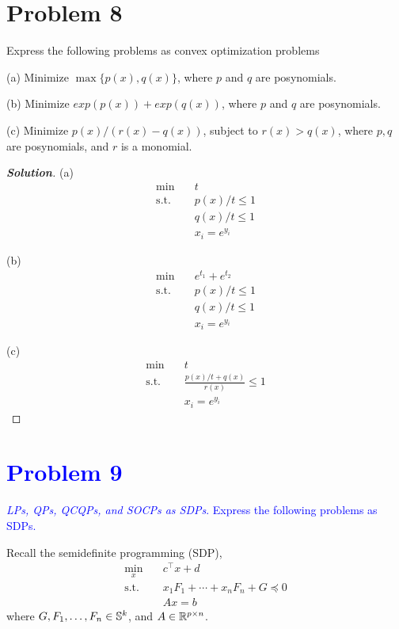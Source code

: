 \documentclass[11pt]{article}
\newenvironment{solution}
  {\renewcommand\qedsymbol{$\square$}\begin{proof}[\textbf{Solution}]}
  {\end{proof}}
\newcommand{\blue}[1]{\textcolor{blue}{#1}}
\newcommand{\T}{^\top}
\begin{document}
\clearpage
\section*{Problem 8}
Express the following problems as convex optimization problems

(a) Minimize $\max\{p(x), q(x)\}$, where $p$ and $q$ are posynomials.

(b) Minimize $exp(p(x)) + exp(q(x))$, where $p$ and $q$ are posynomials.

(c) Minimize $p(x) / (r(x) - q(x))$, subject to $r(x) > q(x)$, where $p, q$ are posynomials, and $r$ is a monomial.

\begin{solution}
  (a)
  \begin{align*}
    \min \quad & t\\
    \text{s.t.} \quad 
    & p(x) / t \leq 1\\
    & q(x) / t \leq 1\\
    & x_i = e^{y_i}
  \end{align*}

  (b)
  \begin{align*}
    \min \quad & e^{t_1} + e^{t_2}\\
    \text{s.t.} \quad 
    & p(x) / t \leq 1\\
    & q(x) / t \leq 1\\
    & x_i = e^{y_i}
  \end{align*}

  (c)
  \begin{align*}
    \min \quad & t\\
    \text{s.t.} \quad 
    & \frac{p(x)/t + q(x)}{r(x)} \leq 1\\
    & x_i = e^{y_i}
  \end{align*}
\end{solution}


\clearpage
\section*{\blue{Problem 9}}
\blue{\textit{LPs, QPs, QCQPs, and SOCPs as SDPs}. Express the following problems as SDPs.}

Recall the semidefinite programming (SDP),
\begin{align*}
  \min_x \quad & c\T x + d\\
  \text{s.t.}\quad 
  & x_1 F_1 + \cdots + x_n F_n + G \preceq 0\\
  & Ax = b
\end{align*}
where $G, F_1, \dots, F_n \in{{\mathbb{S}}}^k$, and $A\in{{\mathbb{R}}}^{p\times n}$.
\end{document}
